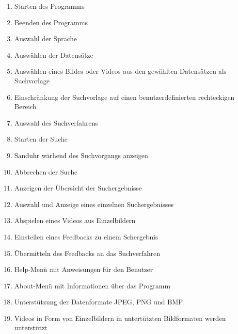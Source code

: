 \begin{enumerate} [label=\bfseries /F \arabic*0/]
	\subsection{Pflicht}
	\item Starten des Programms
	\item Beenden des Programms
	\item Auswahl der Sprache
	\item Ausw\"ahlen der Datens\"atze
	\item Ausw\"ahlen eines Bildes oder Videos aus den gewählten Datensätzen als Suchvorlage
	\item Einschränkung der Suchvorlage auf einen benutzerdefinierten rechteckigen Bereich
	\item Auswahl des Suchverfahrens
	\item Starten der Suche
	\item Sanduhr w\"arhend des Suchvorgangs anzeigen 
	\item Abbrechen der Suche
	\item Anzeigen der \"Ubersicht der Suchergebnisse
	\item Auswahl und Anzeige eines einzelnen Suchergebnisses
	\item Abspielen eines Videos aus Einzelbildern
	\item Einstellen eines Feedbacks zu einem Schergebnis
	\item \"Ubermitteln des Feedbacks an das Suchverfahren
	\item Help-Menü mit Anweisungen für den Benutzer
	\item About-Menü mit Informationen über das Programm
	\item Unterstützung der Datenformate JPEG, PNG und BMP
	\item Videos in Form von Einzelbildern in untert\"utzten Bildformaten werden unterst\"utzt

\end{enumerate}
